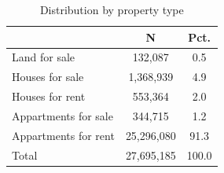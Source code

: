 \begin{table}[htbp]\centering
\def\sym#1{\ifmmode^{#1}\else\(^{#1}\)\fi}
\caption{Distribution by property type}
\begin{tabular}{l*{1}{cc}}
\toprule
            &           N&        Pct.\\
\midrule
Land for sale&     132,087&         0.5\\
Houses for sale&   1,368,939&         4.9\\
Houses for rent&     553,364&         2.0\\
Appartments for sale&     344,715&         1.2\\
Appartments for rent&  25,296,080&        91.3\\
Total       &  27,695,185&       100.0\\
\bottomrule
\end{tabular}
\end{table}
